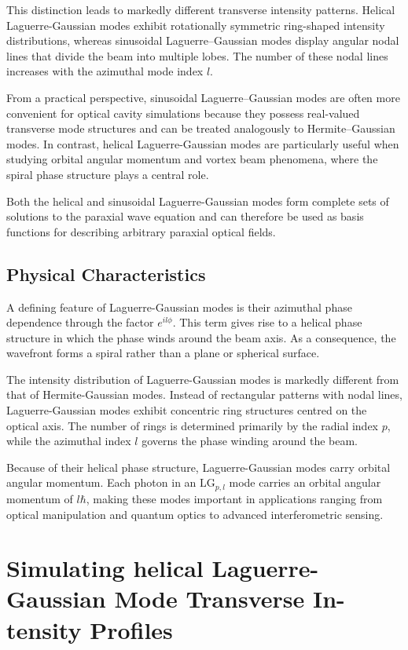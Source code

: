 \documentclass{report}
\begin{document}
This distinction leads to markedly different transverse intensity patterns. Helical Laguerre-Gaussian modes exhibit rotationally symmetric ring-shaped intensity distributions, whereas sinusoidal Laguerre--Gaussian modes display angular nodal lines that divide the beam into multiple lobes. The number of these nodal lines increases with the azimuthal mode index $l$.

From a practical perspective, sinusoidal Laguerre--Gaussian modes are often more convenient for optical cavity simulations because they possess real-valued transverse mode structures and can be treated analogously to Hermite--Gaussian modes. In contrast, helical Laguerre-Gaussian modes are particularly useful when studying orbital angular momentum and vortex beam phenomena, where the spiral phase structure plays a central role.

Both the helical and sinusoidal Laguerre-Gaussian modes form complete sets of solutions to the paraxial wave equation and can therefore be used as basis functions for describing arbitrary paraxial optical fields.

\subsection{Physical Characteristics}

A defining feature of Laguerre-Gaussian modes is their azimuthal phase dependence through the factor $e^{il\phi}$. This term gives rise to a helical phase structure in which the phase winds around the beam axis. As a consequence, the wavefront forms a spiral rather than a plane or spherical surface.

The intensity distribution of Laguerre-Gaussian modes is markedly different from that of Hermite-Gaussian modes. Instead of rectangular patterns with nodal lines, Laguerre-Gaussian modes exhibit concentric ring structures centred on the optical axis. The number of rings is determined primarily by the radial index $p$, while the azimuthal index $l$ governs the phase winding around the beam.

Because of their helical phase structure, Laguerre-Gaussian modes carry orbital angular momentum. Each photon in an $\mathrm{LG}_{p,l}$ mode carries an orbital angular momentum of $l\hbar$, making these modes important in applications ranging from optical manipulation and quantum optics to advanced interferometric sensing.

\section{Simulating helical Laguerre-Gaussian Mode Transverse In-
tensity Profiles}
\end{document}
